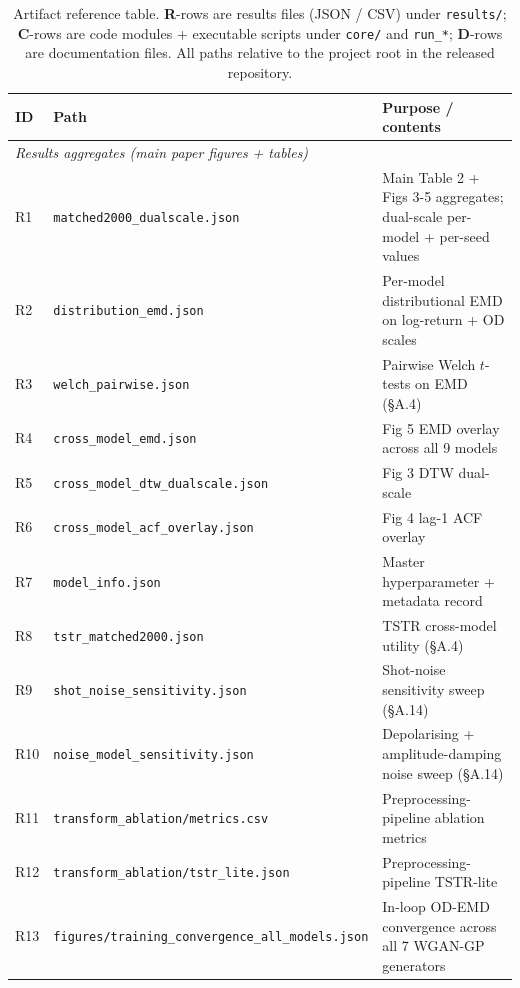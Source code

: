 \begin{table}[!htbp]
\centering
\caption{Artifact reference table. \textbf{R}-rows are results files
(JSON / CSV) under \texttt{results/}; \textbf{C}-rows are code
modules + executable scripts under \texttt{core/} and \texttt{run\_*}; \textbf{D}-rows
are documentation files. All paths relative to the project root in the
released repository.}
\label{tbl:artifact_pointers}
\scriptsize
\setlength{\tabcolsep}{4pt}
\renewcommand{\arraystretch}{1.0}
\begin{tabular}{@{}llp{6.0cm}@{}}
\toprule
\textbf{ID} & \textbf{Path} & \textbf{Purpose / contents} \\
\midrule
\multicolumn{3}{l}{\textit{Results aggregates (main paper figures + tables)}} \\
\midrule
R1  & \texttt{matched2000\_dualscale.json}            & Main Table 2 + Figs 3-5 aggregates; dual-scale per-model + per-seed values \\
R2  & \texttt{distribution\_emd.json}                 & Per-model distributional EMD on log-return + OD scales \\
R3  & \texttt{welch\_pairwise.json}                   & Pairwise Welch $t$-tests on EMD (\S A.4) \\
R4  & \texttt{cross\_model\_emd.json}                 & Fig 5 EMD overlay across all 9 models \\
R5  & \texttt{cross\_model\_dtw\_dualscale.json}      & Fig 3 DTW dual-scale \\
R6  & \texttt{cross\_model\_acf\_overlay.json}        & Fig 4 lag-1 ACF overlay \\
R7  & \texttt{model\_info.json}                       & Master hyperparameter + metadata record \\
R8  & \texttt{tstr\_matched2000.json}                 & TSTR cross-model utility (\S A.4) \\
R9  & \texttt{shot\_noise\_sensitivity.json}          & Shot-noise sensitivity sweep (\S A.14) \\
R10 & \texttt{noise\_model\_sensitivity.json}         & Depolarising + amplitude-damping noise sweep (\S A.14) \\
R11 & \texttt{transform\_ablation/metrics.csv}        & Preprocessing-pipeline ablation metrics \\
R12 & \texttt{transform\_ablation/tstr\_lite.json}    & Preprocessing-pipeline TSTR-lite \\
R13 & \texttt{figures/training\_convergence\_all\_models.json} & In-loop OD-EMD convergence across all 7 WGAN-GP generators \\

\end{tabular}
\end{table}
